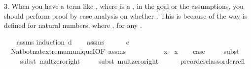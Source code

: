 \begin{isabellebody}
\begin{isamarkuptext}
 3. When you have a term like , where  is a , in the goal or the assumptions, you 
     should perform proof by case analysis on whether . This is because of the way \isa{{\isacharminus}{\kern0pt}} is
     defined for natural numbers, where , for any .%
\end{isamarkuptext}\isamarkuptrue%
%
\isadelimproof
\ \ %
\endisadelimproof
%
\isatagproof
{}\isamarkupfalse%
\ assms\isanewline
{}\isamarkupfalse%
{\isacharparenleft}{\kern0pt}induction\ d{\isacharparenright}{\kern0pt}\isanewline
\ \ \isamarkupfalse%
\ assms{\isacharcolon}{\kern0pt}\ {}\isanewline
\ \ \isamarkupfalse%
\ {}{\isacharcolon}{\kern0pt}\ {\isachardoublequoteopen}c\ {\isacharequal}{\kern0pt}\ {}{\isachardoublequoteclose}\isanewline
\ \ \ \ \isamarkupfalse%
\ \ Nat{\isachardot}{\kern0pt}bot{\isacharunderscore}{\kern0pt}nat{\isacharunderscore}{\kern0pt}{}{\isachardot}{\kern0pt}extremum{\isacharunderscore}{\kern0pt}uniqueI{\isacharbrackleft}{\kern0pt}OF\ assms{\isacharparenleft}{\kern0pt}{}{\isacharparenright}{\kern0pt}{\isacharbrackright}{\kern0pt}\isanewline
\ \ \ \ \isacommand{{\isachardot}{\kern0pt}}\isamarkupfalse%
\isanewline
\ \ \ \ \isamarkupfalse%
\ {\isachardoublequoteopen}{\isacharquery}{\kern0pt}x\ {\isasymle}\ {\isacharquery}{\kern0pt}x{\isachardoublequoteclose}\isanewline
\isanewline
\ \ \isamarkupfalse%
\ {\isacharquery}{\kern0pt}case\isanewline
\ \ \ \ \isamarkupfalse%
{\isacharparenleft}{\kern0pt}subst\ {}{\isacharparenright}{\kern0pt}\ \isanewline
\ \ \ \ \isamarkupfalse%
{\isacharparenleft}{\kern0pt}subst\ mult{\isacharunderscore}{\kern0pt}zero{\isacharunderscore}{\kern0pt}right{\isacharparenright}{\kern0pt}\isanewline
\ \ \ \ \isamarkupfalse%
{\isacharparenleft}{\kern0pt}subst\ mult{\isacharunderscore}{\kern0pt}zero{\isacharunderscore}{\kern0pt}right{\isacharparenright}{\kern0pt}\isanewline
\ \ \ \ \isamarkupfalse%
\ preorder{\isacharunderscore}{\kern0pt}class{\isachardot}{\kern0pt}order{\isachardot}{\kern0pt}refl\isanewline
\ \ \ \ \isacommand{{\isachardot}{\kern0pt}}\isamarkupfalse%
\isanewline
\isanewline
{}\isamarkupfalse%
\isanewline
\ \ \isamarkupfalse%

\end{isabellebody}
